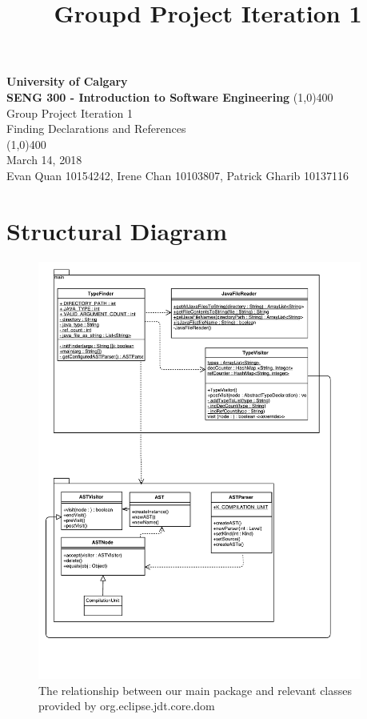 \documentclass[12p]{article}
\title{\vspace{-6ex}Groupd Project Iteration 1}
\date{\vspace{-12ex}}
\begin{document}
\thispagestyle{fancy}

\begin{titlepage}
  \begin{center}
    \vspace{1cm}
    \Large{\textbf{University of Calgary}}\\
    \Large{\textbf{SENG 300  - Introduction to Software Engineering}}
    \vfill
    \line(1,0){400}\\[1mm]
    \huge{Group Project Iteration 1}\\
    \large{Finding Declarations and References}\\
    \line(1,0){400}\\
    \Large March 14, 2018\\
    \vfill
    \large{Evan Quan 10154242, Irene Chan 10103807, Patrick Gharib 10137116}\\
  \end{center}
\end{titlepage}

%
%

\section{Structural Diagram}
\begin{figure}[H]
  \includegraphics[width=0.95\textwidth]{SengUml.pdf}
  \caption{The relationship between our main package and relevant classes provided by org.eclipse.jdt.core.dom} %
  \label{fig:structural}
\end{figure}
\end{document}
